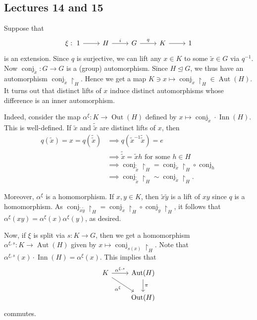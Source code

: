 \documentclass[10pt,letterpaper,cm]{nupset}
\theoremstyle{definition}
\theoremstyle{theorem}
\theoremstyle{remark}
\newcommand{\1}{\mathbf{1}}
\newcommand{\0}{\vec 0}
\DeclareMathOperator{\aut}{Aut}
\DeclareMathOperator{\inn}{Inn}
\DeclareMathOperator{\out}{Out}
\DeclareMathOperator{\conj}{conj}
\begin{document}
\subsection{Lectures 14 and 15}


Suppose that 
\[ 
\begin{tikzcd}
\xi :\ 1 \arrow[r] & H \arrow[r, "i"] & G \arrow[r, "q"] & K \arrow[r] & 1
\end{tikzcd}
\]
is an extension. Since $q$ is surjective, we can lift any $x \in K$ to some $\tilde{x}\in G$ via $q^{-1}$. Now $\conj_{\tilde{x}} : G \to G$ is a (group) automorphism. Since $H\unlhd G$, we thus have an automorphism $\conj_{\tilde{x}}\restriction_H$. Hence we get a map $K \ni x \mapsto \conj_{\tilde{x}}\restriction_H \in \aut(H)$. It turns out that distinct lifts of $x$ induce distinct automorphisms whose difference is an inner automorphism.

Indeed, consider the map $\alpha^{\xi} : K \to \out(H)$ defined by $x \mapsto \conj_{\tilde{x}}\cdot \inn(H)$. This is well-defined. If $\tilde{x}$ and $\tilde{\tilde{x}}$ are distinct lifts of $x$, then 
\begin{align*}
q(\tilde{x}) = x = q(\tilde{\tilde{x}}) &\implies q(\tilde{x}^{-1}\tilde{\tilde{x}}) = e 
\\ & \implies \tilde{\tilde{x}} = \tilde{x}h \text{ for some }h \in H 
\\ & \implies \conj_{\tilde{\tilde{x}}}\restriction_H= \conj_{\tilde{x}}\restriction_H \circ \conj_h 
\\ & \implies \conj_{\tilde{\tilde{x}}}\restriction_H\sim \conj_{\tilde{x}}\restriction_H.
\end{align*}

Moreover, $\alpha^{\xi}$ is a homomorphism. If $x, y \in K$, then $\tilde{x}\tilde{y}$ is a lift of $xy$ since $q$ is a homomorphism.  As  $\conj_{\tilde{x}\tilde{y}}\restriction_H = \conj_{\tilde{x}}\restriction_H \circ \conj_{\tilde{y}}\restriction_H$, it follows that $\alpha^{\xi}(xy) = \alpha^{\xi}(x) \alpha^{\xi}(y)$, as desired.

Now, if $\xi$ is split via $s: K \to G$, then we get a homomorphism $\alpha^{\xi, s} : K \to \aut(H)$ given by $x \mapsto \conj_{s(x)}\restriction_H$. Note that $\alpha^{\xi, s}(x)\cdot \inn(H) = \alpha^{\xi}(x)$. This implies that
\[
\begin{tikzcd}
K \arrow[r, "{\alpha^{\xi, s}}"] \arrow[rd, "\alpha^{\xi}"'] & \aut(H) \arrow[d, "\pi"] \\
 & \out(H)
\end{tikzcd}
\]
commutes.
\end{document}
